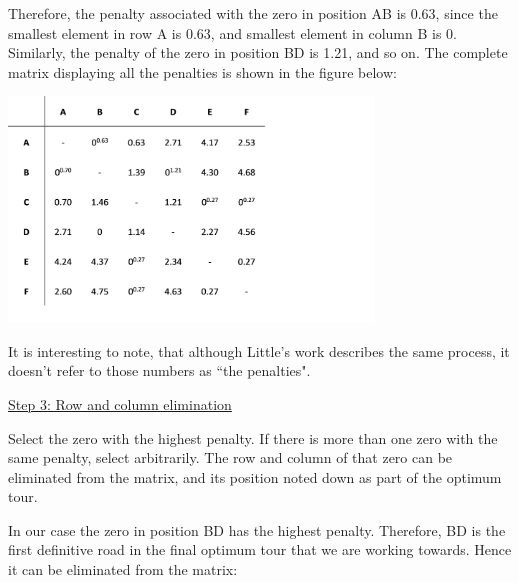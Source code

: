 \vspace{5mm}

Therefore, the penalty associated with the zero in position AB is 0.63, since the smallest element in row A is 0.63, and smallest element in column B is 0. Similarly, the penalty of the zero in position BD is 1.21, and so on. The complete matrix displaying all the penalties is shown in the figure below:	
\vspace{3mm}
	
\includegraphics[height=6cm]{dmpenalties}
	
It is interesting to note, that although Little’s work describes the same process, it doesn’t refer to those numbers as “the penalties".

\vspace{5mm}

\underline{Step 3: Row and column elimination}
\vspace{1mm}

Select the zero with the highest penalty. If there is more than one zero with the same penalty, select arbitrarily. The row and column of that zero can be eliminated from the matrix, and its position noted down as part of the optimum tour.

\vspace{5mm}

In our case the zero in position BD has the highest penalty. Therefore, BD is the first definitive road in the final optimum tour that we are working towards. Hence it can be eliminated from the matrix:

\vspace{3mm}

